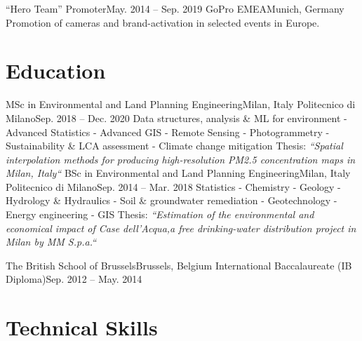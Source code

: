\documentclass[letterpaper,11pt]{article}
\begin{document}
\sectionElement
{“Hero Team” Promoter}{May. 2014 -- Sep. 2019}
{GoPro EMEA}{Munich, Germany}
{Promotion of cameras and brand-activation in selected events in Europe.}
{}
\sectionElementListEnd


\section{Education}
\sectionElementListStart

\sectionElement
{MSc in Environmental and Land Planning Engineering}{Milan, Italy}
{Politecnico di Milano}{Sep. 2018 -- Dec. 2020}
{\scriptsize Data structures, analysis \& ML for environment - Advanced Statistics - Advanced GIS -
  Remote Sensing - Photogrammetry -
  Sustainability \& LCA assessment - Climate change mitigation\newline
  {\scriptsize Thesis: \it “Spatial interpolation methods for producing high-resolution PM2.5 concentration maps in Milan, Italy“}}
{}
\sectionElement
{BSc in Environmental and Land Planning Engineering}{Milan, Italy}
{Politecnico di Milano}{Sep. 2014 -- Mar. 2018}
{\scriptsize Statistics - Chemistry - Geology - Hydrology \& Hydraulics
  - Soil \& groundwater remediation - Geotechnology - Energy engineering - GIS\newline
  {\scriptsize Thesis: \it “Estimation of the environmental and economical impact of Case dell'Acqua,a free drinking-water distribution project in Milan by MM S.p.a.“}}
{}

\sectionElement
{The British School of Brussels}{Brussels, Belgium}
{International Baccalaureate (IB Diploma)}{Sep. 2012 -- May. 2014}
{}{}

\sectionElementListEnd

\section{Technical Skills}
\end{document}
